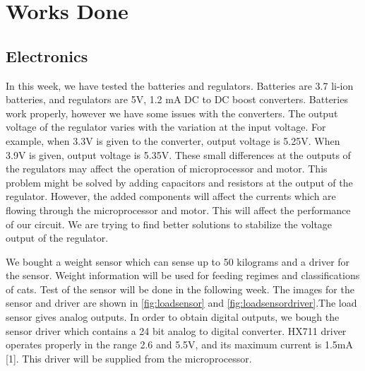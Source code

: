 \section{Works Done}
\label{sec:worksDone}


\subsection{Electronics}

In this week, we have tested the batteries and regulators.
Batteries are 3.7 li-ion batteries, and regulators are 5V, 1.2 mA DC to DC boost converters. Batteries work properly, however we have some issues with the converters. The output voltage of the regulator varies with the variation at the input voltage. For example, when 3.3V is given to the converter, output voltage is 5.25V. When 3.9V is given, output voltage is 5.35V. These small differences at the outputs of the regulators may affect the operation of microprocessor and motor. This problem might be solved by adding capacitors and resistors at the output of the regulator. However, the added components will affect the currents which are flowing through the microprocessor and motor. This will affect the performance of our circuit. We are trying to find better solutions to stabilize the voltage output of the regulator.

We bought a weight sensor which can sense up to 50 kilograms and a driver for the sensor. Weight information will be used for feeding regimes and classifications of cats. Test of the sensor will be done in the following week. The images for the sensor and driver are shown in \ref{fig:loadsensor} and \ref{fig:loadsensordriver}.The load sensor gives analog outputs. In order to obtain digital outputs, we bough the sensor driver which contains a 24 bit analog to digital converter. HX711 driver operates properly in the range 2.6 and 5.5V, and its maximum current is 1.5mA [1]. This driver will be supplied from the microprocessor.

